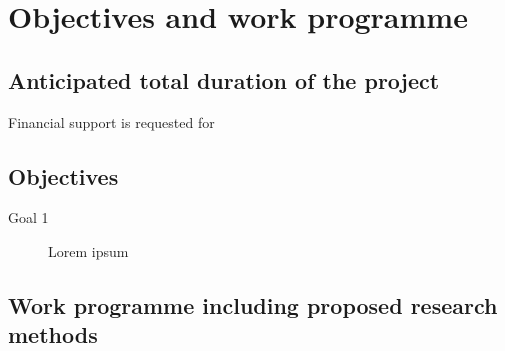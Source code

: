 \section{Objectives and work programme}

\subsection{Anticipated total duration of the project}
Financial support is requested for 

\subsection{Objectives}

\addtocounter{secnumdepth}{1}

\begin{description}
\item[Goal 1] Lorem ipsum 
\end{description}

\subsection{Work programme including proposed research methods}



\let\oldpara=\theparagraph
\let\oldsssec=\thesubsubsection 
\addtocounter{secnumdepth}{1}

\renewcommand{\thesubsubsection}{WP\,\arabic{subsubsection}}
\renewcommand{\theparagraph}{T\,\arabic{subsubsection}.\arabic{paragraph}}



